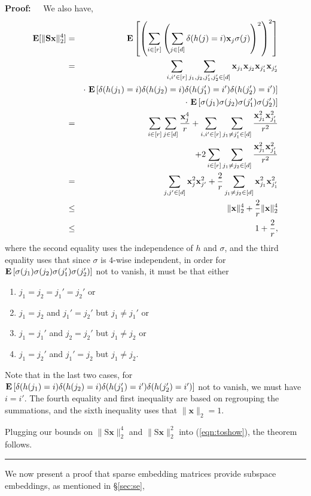\documentclass[11pt]{article}
\newenvironment{proof}{\begin{trivlist} \item {\bf Proof:~~}}
  {\qed\end{trivlist}}
\newcommand{\mat}[1]{{\ensuremath{\bm{\mathrm{#1}}}}}
\def\matS{\mat{S}}
\def\frac#1#2{{#1\over #2}}
\def\qed{\hfill\rule{2mm}{2mm}}
\def\x{{\mathbf x}}
\begin{document}
\begin{proof}
We also have,
\begin{eqnarray*}
{\bf E}[\|\matS\x\|_2^4] & = & {\bf E} \left [ \left (\sum_{i \in [r]} \left (\sum_{j \in [d]} \delta(h(j) = i) \x_j \sigma(j) \right )^2 \right )^2 \right ]\\
& = & \sum_{i,i' \in [r]} \sum_{j_1,j_2, j'_1, j'_2  \in [d]} \x_{j_1}\x_{j_2}\x_{j_1'}\x_{j_2'}\\
&& \cdot \ {\bf E} \left [\delta(h(j_1) = i)\delta(h(j_2)=i)\delta(h(j'_1) = i')\delta(h(j'_2) = i') \right ]\\
&& \cdot \ {\bf E} \left [\sigma(j_1) \sigma(j_2) \sigma(j_1')\sigma(j_2') \right ]\\
& = & \sum_{i \in [r]} \sum_{j \in [d]} \frac{\x_j^4}{r} + \sum_{i, i' \in [r]} \sum_{j_1 \neq j_1' \in [d]} \frac{\x_{j_1}^2 \x_{j_1'}^2}{r^2}\\
&& + 2\sum_{i \in [r]} \sum_{j_1 \neq j_2 \in [d]} \frac{\x_{j_1}^2 \x_{j'_1}^2}{r^2}\\
& = & \sum_{j, j' \in [d]} \x_j^2 \x_{j'}^2 + \frac{2}{r}\sum_{j_1 \neq j_2 \in [d]} \x_{j_1}^2 \x_{j'_1}^2\\
& \leq & \|\x\|_2^4 + \frac{2}{r} \|\x\|_2^4\\
& \leq & 1 + \frac{2}{r},
\end{eqnarray*}
where the second equality uses the independence of $h$ and $\sigma$, and the third equality uses that since $\sigma$ is $4$-wise independent, in order for 
${\bf E} \left [\sigma(j_1) \sigma(j_2) \sigma(j_1')\sigma(j_2') \right ]$ not to vanish, it must be that either 
\begin{enumerate}
\item $j_1 = j_2 = j_1' = j_2'$ or
\item $j_1 = j_2$ and $j_1' = j_2'$ but $j_1 \neq j_1'$ or
\item $j_1 = j_1'$ and $j_2 = j_2'$ but $j_1 \neq j_2$ or
\item $j_1 = j_2'$ and $j_1' = j_2$ but $j_1 \neq j_2$.
\end{enumerate}
Note that in the last two cases, for ${\bf E} \left [\delta(h(j_1) = i)\delta(h(j_2)=i)\delta(h(j'_1) = i')\delta(h(j'_2) = i') \right ]$ not to vanish,
we must have $i = i'$. The fourth equality and first inequality are based on regrouping the summations, and the sixth inequality uses that $\|\x\|_2 = 1$. 

Plugging our bounds on $\|\matS \x\|_2^4$ and $\|\matS \x\|_2^2$ into (\ref{eqn:toshow}), the theorem follows. 
\end{proof}
We now present a proof that sparse embedding matrices provide subspace embeddings, as mentioned in \S\ref{sec:se},
\end{document}

